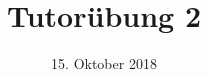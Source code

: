 %
% 
% 
%







\newcommand{\Datum}{\today}

\renewcommand{\PraesentationFusszeileZusatz}{| Tutorium Grundlagen: Datenbanken WS 18/19}

\title{Tutorübung 2}
\author{\PersonVorname{} \PersonNachname}
\institute[]{\UniversitaetName \\ \FakultaetName}
\date[\Datum]{15. Oktober 2018}



\setlength{\baselineskip}{\PraesentationAbstandAbsatz}
\setlength{\parskip}{\baselineskip}

\PraesentationMasterStandard

\PraesentationTitelseite %

